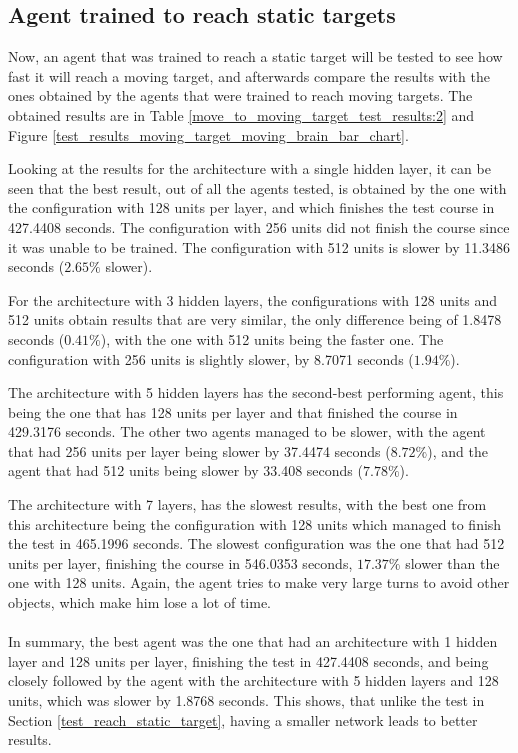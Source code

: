 \subsection{Agent trained to reach static targets}

Now, an agent that was trained to reach a static target will be tested to see how fast it will reach a moving target, and afterwards compare the results with the ones obtained by the agents that were trained to reach moving targets. The obtained results are in Table \ref{move_to_moving_target_test_results:2} and Figure \ref{test_results_moving_target_moving_brain_bar_chart}.

Looking at the results for the architecture with a single hidden layer, it can be seen that the best result, out of all the agents tested, is obtained by the one with the configuration with 128 units per layer, and which finishes the test course in 427.4408 seconds. The configuration with 256 units did not finish the course since it was unable to be trained. The configuration with 512 units is slower by 11.3486 seconds ($2.65\%$ slower).

For the architecture with 3 hidden layers, the configurations with 128 units and 512 units obtain results that are very similar, the only difference being of 1.8478 seconds ($0.41\%$), with the one with 512 units being the faster one. The configuration with 256 units is slightly slower, by 8.7071 seconds ($1.94\%$).

The architecture with 5 hidden layers has the second-best performing agent, this being the one that has 128 units per layer and that finished the course in 429.3176 seconds. The other two agents managed to be slower, with the agent that had 256 units per layer being slower by 37.4474 seconds ($8.72\%$), and the agent that had 512 units being slower by 33.408 seconds ($7.78\%$).

The architecture with 7 layers, has the slowest results, with the best one from this architecture being the configuration with 128 units which managed to finish the test in 465.1996 seconds. The slowest configuration was the one that had 512 units per layer, finishing the course in 546.0353 seconds, $17.37\%$ slower than the one with 128 units. Again, the agent tries to make very large turns to avoid other objects, which make him lose a lot of time.

\paragraph{}
In summary, the best agent was the one that had an architecture with 1 hidden layer and 128 units per layer, finishing the test in 427.4408 seconds, and being closely followed by the agent with the architecture with 5 hidden layers and 128 units, which was slower by 1.8768 seconds. This shows, that unlike the test in Section \ref{test_reach_static_target}, having a smaller network leads to better results.

